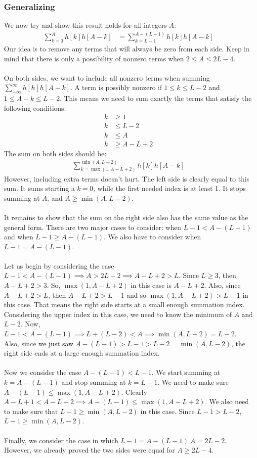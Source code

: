 \subsubsection*{Generalizing}
We now try and show this result holds for all integers $A$:
\begin{align*}
\sum_{k=0}^{A}h[k]h[A-k] &= \sum_{k=L-1}^{A-(L-1)}h[k]h[A-k]
\end{align*}
Our idea is to remove any terms that will always be zero from each side. Keep in mind that there is only a possibility of nonzero terms when $2 \leq A \leq 2L -4$.
\\\\
On both sides, we want to include all nonzero terms when summing $\sum_{-\infty}^{\infty}h[h]h[A-k]$. A term is possibly nonzero if $1 \leq k \leq L - 2$ and $1 \leq A - k \leq L -2$. This means we need to sum exactly the terms that satisfy the following conditions:
\begin{align*}
k &\geq 1 \\
k &\leq L-2 \\
k &\leq A \\
k &\geq A - L + 2
\end{align*}
The sum on both sides should be:
\begin{align*}
\sum_{k=\max(1,A-L+2)}^{\min(A,L-2)}h[k]h[A-k] 
\end{align*}
However, including extra terms doesn't hurt. The left side is clearly equal to this sum. It sums starting a $k = 0$, while the first needed index is at least 1. It stops summing at $A$, and $A \geq \min(A,L-2)$.
\\\\
It remains to show that the sum on the right side also has the same value as the general form. There are two major cases to consider: when $L-1 < A-(L-1)$ and when $L - 1 \geq  A-(L-1)$.  We also have to consider when $L -1 = A-(L-1)$.
\\\\
Let us begin by considering the case $L-1 < A -(L-1) \implies A > 2L - 2 \implies A - L +2 > L$. Since $L \geq 3$, then $A - L + 2 > 3$. So, $\max(1,A-L+2)$ in this case is $A-L+2$. Also, since $A-L+2 > L$, then $A-L+2 > L -1$ and so $\max(1,A-L+2) > L - 1$ in this case. That means the right side starts at a small enough summation index. Considering the upper index in this case, we need to know the minimum of $A$ and $L-2$. Now, $L-1 < A -(L-1) \implies L+(L-2) < A \implies \min{(A,L-2)} = L-2$. Also, since we just saw $A-(L-1) > L - 1 > L - 2 = \min{(A,L-2)}$, the right side ends at a large enough summation index.
\\\\
Now we consider the case $A-(L-1) < L - 1$. We start summing at $k = A -(L-1)$ and stop summing at $k = L -1$. We need to make sure $A-(L-1) \leq \max(1,A-L+2)$. Clearly $A-L+1 < A-L+2 \implies A-(L-1) \leq \max(1,A-L+2)$. We also need to make sure that $L-1 \geq \min(A,L-2)$ in this case. Since $L -1 > L - 2$, $L-1 \geq \min(A,L-2)$.
\\\\
Finally, we consider the case in which $L-1 = A-(L-1) \ A = 2L-2$. However, we already proved the two sides were equal for $A \geq 2L-4$.
\clearpage
